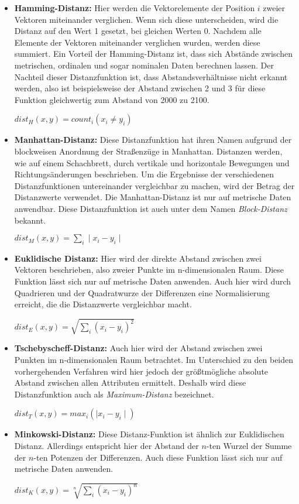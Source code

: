\begin{itemize}
\item \textbf{Hamming-Distanz:} Hier werden die Vektorelemente der Position \(i\) zweier Vektoren miteinander verglichen. Wenn sich diese unterscheiden, wird die Distanz auf den Wert 1 gesetzt, bei gleichen Werten 0. Nachdem alle Elemente der Vektoren miteinander verglichen wurden, werden diese summiert. Ein Vorteil der Hamming-Distanz ist, dass sich Abstände zwischen metrischen, ordinalen und sogar nominalen Daten berechnen lassen. Der Nachteil dieser Distanzfunktion ist, dass Abstandsverhältnisse nicht erkannt werden, also ist beispielsweise der Abstand zwischen 2 und 3 für diese Funktion gleichwertig zum Abstand von 2000 zu 2100.

\(dist_H(x,y) = count_i(x_i \neq y_i) \)

\item \textbf{Manhattan-Distanz:} Diese Distanzfunktion hat ihren Namen aufgrund der blockweisen Anordnung der Straßenzüge in Manhattan. Distanzen werden, wie auf einem Schachbrett, durch vertikale und horizontale Bewegungen und Richtungsänderungen beschrieben. Um die Ergebnisse der verschiedenen Distanzfunktionen untereinander vergleichbar zu machen, wird der Betrag der Distanzwerte verwendet. Die Manhattan-Distanz ist nur auf metrische Daten anwendbar. Diese Distanzfunktion ist auch unter dem Namen \textit{Block-Distanz} bekannt.   

\(dist_M(x,y) = \sum_{i} \mid x_i - y_i \mid \)


\item \textbf{Euklidische Distanz:} Hier wird der direkte Abstand zwischen zwei Vektoren beschrieben, also zweier Punkte im n-dimensionalen Raum. Diese Funktion lässt sich nur auf metrische Daten anwenden. Auch hier wird durch Quadrieren und der Quadratwurze der Differenzen eine Normalisierung erreicht, die die Distanzwerte vergleichbar macht. 

\(dist_E(x,y) = \sqrt{\sum_{i}(x_i - y_i)^2} \)

\item \textbf{Tschebyscheff-Distanz:}  Auch hier wird der Abstand zwischen zwei Punkten im n-dimensionalen Raum betrachtet. Im Unterschied zu den beiden vorhergehenden Verfahren wird hier jedoch der größtmögliche absolute Abstand zwischen allen Attributen ermittelt. Deshalb wird diese Distanzfunktion auch als \textit{Maximum-Distanz}  bezeichnet. 

\(dist_T(x,y) = max_i(\mid x_i - y_i \mid) \)

\item \textbf{Minkowski-Distanz:}  Diese Distanz-Funktion ist ähnlich zur Euklidischen Distanz. Allerdings entspricht hier der Abstand der \(n\)-ten Wurzel der Summe der  \(n\)-ten Potenzen der Differenzen. Auch diese Funktion lässt sich nur auf metrische Daten anwenden.

\(dist_K(x,y) = \sqrt[n]{\sum_{i}(x_i - y_i)^n} \)

\end{itemize}

